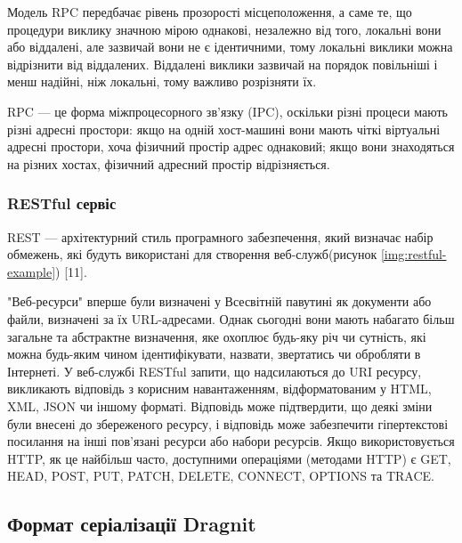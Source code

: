\documentclass{lib/styles/default-style}
\begin{document}

    Модель RPC передбачає рівень прозорості місцеположення, а саме те,
    що процедури виклику значною мірою однакові, незалежно від того,
    локальні вони або віддалені, але зазвичай вони не є ідентичними,
    тому локальні виклики можна відрізнити від віддалених.
    Віддалені виклики зазвичай на порядок повільніші і менш надійні, ніж локальні, тому важливо розрізняти їх.

    RPC --- це форма міжпроцесорного зв'язку (IPC), оскільки різні процеси
    мають різні адресні простори: якщо на одній хост-машині вони мають чіткі віртуальні
    адресні простори, хоча фізичний простір адрес однаковий; якщо вони знаходяться на різних хостах,
    фізичний адресний простір відрізняється.

    \subsubsection{RESTful сервіс}
    
    REST --- архітектурний стиль програмного забезпечення, який визначає набір обмежень,
    які будуть використані для створення веб-служб(рисунок \ref{img:restful-example}) [11].
    

    "Веб-ресурси" вперше були визначені у Всесвітній павутині як документи або файли, визначені за їх URL-адресами.
    Однак сьогодні вони мають набагато більш загальне та абстрактне визначення, яке охоплює будь-яку річ чи сутність,
    які можна будь-яким чином ідентифікувати, назвати, звертатись чи обробляти в Інтернеті.
    У веб-службі RESTful запити, що надсилаються до URI ресурсу, викликають відповідь з корисним навантаженням,
    відформатованим у HTML, XML, JSON чи іншому форматі. Відповідь може підтвердити, що деякі зміни були внесені
    до збереженого ресурсу, і відповідь може забезпечити гіпертекстові посилання на інші пов'язані ресурси або набори ресурсів.
    Якщо використовується HTTP, як це найбільш часто, доступними операціями (методами HTTP) є GET, HEAD, POST, PUT,
    PATCH, DELETE, CONNECT, OPTIONS та TRACE.



    \subsection{Формат серіалізації Dragnit}
\end{document}
